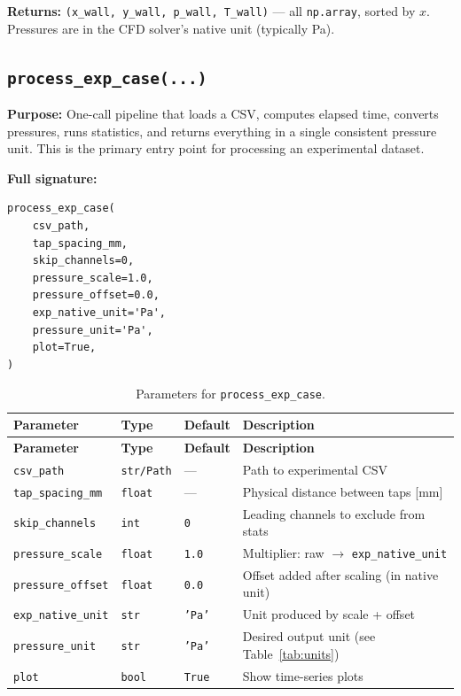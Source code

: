 \documentclass[11pt, letterpaper]{article}
\begin{document}
\textbf{Returns:} \texttt{(x\_wall, y\_wall, p\_wall, T\_wall)} --- all
\texttt{np.array}, sorted by $x$. Pressures are in the CFD solver's
native unit (typically Pa).

\subsection{\texttt{process\_exp\_case(...)}}
\label{subsec:process_exp_case}

\textbf{Purpose:} One-call pipeline that loads a CSV, computes elapsed
time, converts pressures, runs statistics, and returns everything in a
single consistent pressure unit. This is the primary entry point for
processing an experimental dataset.

\textbf{Full signature:}
\begin{lstlisting}[numbers=none]
process_exp_case(
    csv_path,
    tap_spacing_mm,
    skip_channels=0,
    pressure_scale=1.0,
    pressure_offset=0.0,
    exp_native_unit='Pa',
    pressure_unit='Pa',
    plot=True,
)
\end{lstlisting}

\begin{longtable}{@{}lllp{6.5cm}@{}}
\caption{Parameters for \texttt{process\_exp\_case}.}
\label{tab:process_exp_case_params} \\
\toprule
\textbf{Parameter} & \textbf{Type} & \textbf{Default} & \textbf{Description} \\
\midrule
\endfirsthead
\toprule
\textbf{Parameter} & \textbf{Type} & \textbf{Default} & \textbf{Description} \\
\midrule
\endhead
\texttt{csv\_path}        & \texttt{str/Path} & ---           & Path to experimental CSV \\
\texttt{tap\_spacing\_mm} & \texttt{float}    & ---           & Physical distance between taps [mm] \\
\texttt{skip\_channels}   & \texttt{int}      & \texttt{0}    & Leading channels to exclude from stats \\
\texttt{pressure\_scale}  & \texttt{float}    & \texttt{1.0}  & Multiplier: raw $\to$ \texttt{exp\_native\_unit} \\
\texttt{pressure\_offset} & \texttt{float}    & \texttt{0.0}  & Offset added after scaling (in native unit) \\
\texttt{exp\_native\_unit}& \texttt{str}      & \texttt{'Pa'} & Unit produced by scale + offset \\
\texttt{pressure\_unit}   & \texttt{str}      & \texttt{'Pa'} & Desired output unit (see Table~\ref{tab:units}) \\
\texttt{plot}             & \texttt{bool}     & \texttt{True} & Show time-series plots \\
\bottomrule
\end{longtable}
\end{document}
